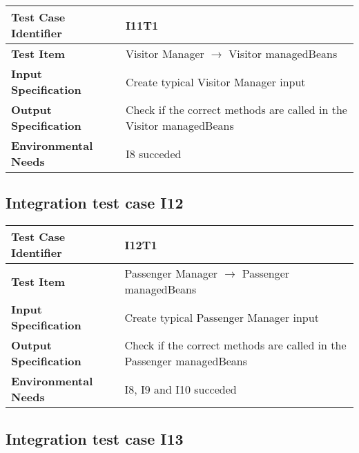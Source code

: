 \begin{table}[!htbp]
\begin{center}
\begin{tabular}[t]{p{}p{}}

\hline
\textbf{Test Case Identifier} & I11T1 \\
\hline
\textbf{Test Item} & Visitor Manager $\rightarrow$ Visitor managedBeans \\
\hline
\textbf{Input Specification} & Create typical Visitor Manager input  \\
\hline
\textbf{Output Specification} & Check if the correct methods are called in the Visitor managedBeans \\
\hline
\textbf{Environmental Needs} & I8 succeded \\
\hline

\end{tabular}
\end{center}
\end{table}
\clearpage


\subsection{Integration test case I12}

\begin{table}[!htbp]
\begin{center}
\begin{tabular}[t]{p{}p{}}

\hline
\textbf{Test Case Identifier} & I12T1 \\
\hline
\textbf{Test Item} & Passenger Manager $\rightarrow$ Passenger managedBeans \\
\hline
\textbf{Input Specification} & Create typical Passenger Manager input  \\
\hline
\textbf{Output Specification} & Check if the correct methods are called in the Passenger managedBeans \\
\hline
\textbf{Environmental Needs} & I8, I9 and I10 succeded \\
\hline

\end{tabular}
\end{center}
\end{table}

\subsection{Integration test case I13}

